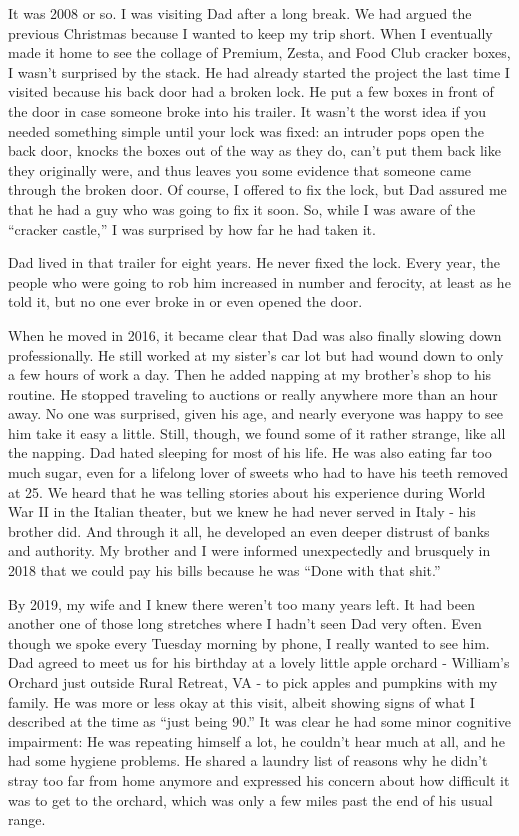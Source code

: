 \documentclass{article}
\begin{document}
It was 2008 or so. I was visiting Dad after a long break. We had argued the previous Christmas because I wanted to keep my trip short. When I eventually made it home to see the collage of Premium, Zesta, and Food Club cracker boxes, I wasn't surprised by the stack. He had already started the project the last time I visited because his back door had a broken lock. He put a few boxes in front of the door in case someone broke into his trailer. It wasn't the worst idea if you needed something simple until your lock was fixed: an intruder pops open the back door, knocks the boxes out of the way as they do, can't put them back like they originally were, and thus leaves you some evidence that someone came through the broken door. Of course, I offered to fix the lock, but Dad assured me that he had a guy who was going to fix it soon. So, while I was aware of the ``cracker castle,'' I was surprised by how far he had taken it.

Dad lived in that trailer for eight years. He never fixed the lock. Every year, the people who were going to rob him increased in number and ferocity, at least as he told it, but no one ever broke in or even opened the door.

When he moved in 2016, it became clear that Dad was also finally slowing down professionally. He still worked at my sister's car lot but had wound down to only a few hours of work a day. Then he added napping at my brother's shop to his routine. He stopped traveling to auctions or really anywhere more than an hour away. No one was surprised, given his age, and nearly everyone was happy to see him take it easy a little. Still, though, we found some of it rather strange, like all the napping. Dad hated sleeping for most of his life. He was also eating far too much sugar, even for a lifelong lover of sweets who had to have his teeth removed at 25. We heard that he was telling stories about his experience during World War II in the Italian theater, but we knew he had never served in Italy - his brother did. And through it all, he developed an even deeper distrust of banks and authority. My brother and I were informed unexpectedly and brusquely in 2018 that we could pay his bills because he was ``Done with that shit.''

By 2019, my wife and I knew there weren't too many years left. It had been another one of those long stretches where I hadn't seen Dad very often. Even though we spoke every Tuesday morning by phone, I really wanted to see him. Dad agreed to meet us for his birthday at a lovely little apple orchard - William's Orchard just outside Rural Retreat, VA - to pick apples and pumpkins with my family. He was more or less okay at this visit, albeit showing signs of what I described at the time as ``just being 90.'' It was clear he had some minor cognitive impairment: He was repeating himself a lot, he couldn't hear much at all, and he had some hygiene problems. He shared a laundry list of reasons why he didn't stray too far from home anymore and expressed his concern about how difficult it was to get to the orchard, which was only a few miles past the end of his usual range.
\end{document}
